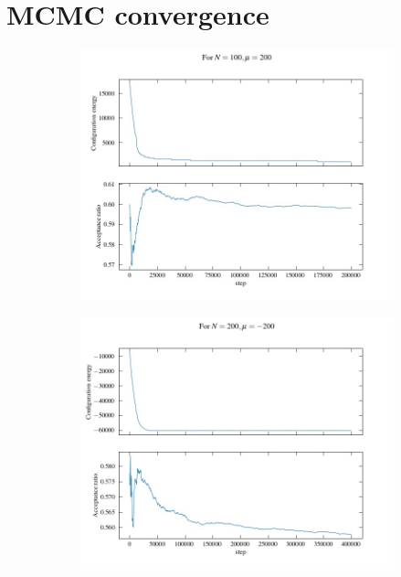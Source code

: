 \documentclass[11pt]{article}
\begin{document}
\section{MCMC convergence}\label{MCMC convergence}
\begin{figure}[H]
\begin{subfigure}{.5\textwidth}
	\centering
	\includegraphics[scale=0.35]{convergence2.jpg}
	\caption{}
\end{subfigure}
\begin{subfigure}{.5\textwidth}
	\centering
	\includegraphics[scale=0.35]{convergence3.jpg}
	\caption{}

\end{subfigure}
\end{figure}
\end{document}
